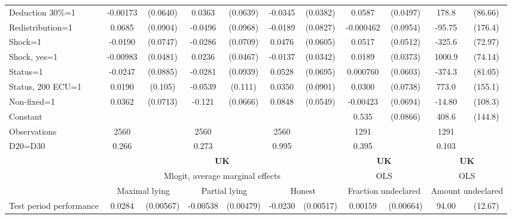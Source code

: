 \begin{tabular}{l|cccccc|cc|cc}
Deduction 30\%=1& -0.00173         & (0.0640)&   0.0363         & (0.0639)&  -0.0345         & (0.0382)&   0.0587         & (0.0497)&    178.8\sym{**} &  (86.66)\\
Redistribution=1&   0.0685         & (0.0904)&  -0.0496         & (0.0968)&  -0.0189         & (0.0827)&-0.000462         & (0.0954)&   -95.75         &  (176.4)\\
Shock=1         &  -0.0190         & (0.0747)&  -0.0286         & (0.0709)&   0.0476         & (0.0605)&   0.0517         & (0.0512)&   -325.6\sym{***}&  (72.97)\\
Shock, yes=1    & -0.00983         & (0.0481)&   0.0236         & (0.0467)&  -0.0137         & (0.0342)&   0.0189         & (0.0373)&   1000.9\sym{***}&  (74.14)\\
Status=1        &  -0.0247         & (0.0885)&  -0.0281         & (0.0939)&   0.0528         & (0.0695)& 0.000760         & (0.0603)&   -374.3\sym{***}&  (81.05)\\
Status, 200 ECU=1&   0.0190         &  (0.105)&  -0.0539         &  (0.111)&   0.0350         & (0.0901)&   0.0300         & (0.0738)&    773.0\sym{***}&  (155.1)\\
Non-fixed=1     &   0.0362         & (0.0713)&   -0.121\sym{*}  & (0.0666)&   0.0848         & (0.0549)& -0.00423         & (0.0694)&   -14.80         &  (108.3)\\
Constant        &                  &         &                  &         &                  &         &    0.535\sym{***}& (0.0866)&    408.6\sym{***}&  (144.8)\\
\hline
Observations    &     2560         &         &     2560         &         &     2560         &         &     1291         &         &     1291         &         \\
D20=D30         &    0.266         &         &    0.273         &         &    0.995         &         &    0.395         &         &    0.103         &         \\
\hline\hline
&\multicolumn{6}{c|}{\bf UK}&\multicolumn{2}{c|}{\bf UK}&\multicolumn{2}{c}{\bf UK}\\ &\multicolumn{6}{c|}{Mlogit, average marginal effects }&\multicolumn{2}{c|}{OLS}&\multicolumn{2}{c}{OLS}\\
                &\multicolumn{2}{c}{Maximal lying}&\multicolumn{2}{c}{Partial lying}&\multicolumn{2}{c}{Honest}  &\multicolumn{2}{c}{Fraction undeclared}&\multicolumn{2}{c}{Amount undeclared}\\
\hline
Test period performance&   0.0284\sym{***}&(0.00567)& -0.00538         &(0.00479)&  -0.0230\sym{***}&(0.00517)&  0.00159         &(0.00664)&    94.00\sym{***}&  (12.67)\\

\end{tabular}
